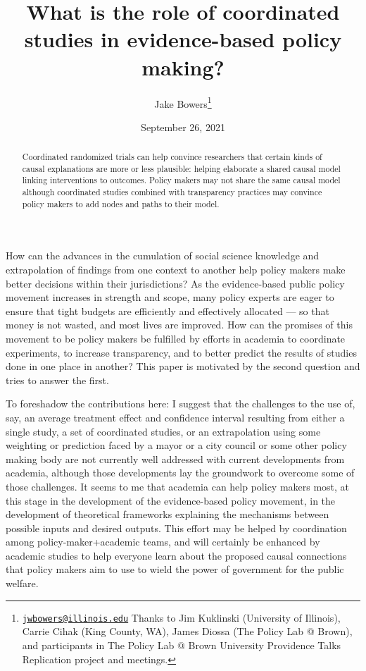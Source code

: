 \documentclass[
  11pt,
]{article}
\title{What is the role of coordinated studies in evidence-based policy
making?}
\author{Jake Bowers\footnote{\href{mailto:jwbowers@illinois.edu}{\nolinkurl{jwbowers@illinois.edu}}
  Thanks to Jim Kuklinski (University of Illinois), Carrie Cihak (King
  County, WA), James Diossa (The Policy Lab @ Brown), and participants
  in The Policy Lab @ Brown University Providence Talks Replication
  project and meetings.}}
\date{September 26, 2021}
\begin{document}
\maketitle

\begin{abstract}

Coordinated randomized trials can help convince researchers that certain kinds
of causal explanations are more or less plausible: helping elaborate a shared
causal model linking interventions to outcomes. Policy makers may not share the
same causal model although coordinated studies combined with transparency
practices may convince policy makers to add nodes and paths to their model.

\end{abstract}

How can the advances in the cumulation of social science knowledge and
extrapolation of findings from one context to another help policy makers
make better decisions within their jurisdictions? As the evidence-based
public policy movement increases in strength and scope, many policy
experts are eager to ensure that tight budgets are efficiently and
effectively allocated --- so that money is not wasted, and most lives
are improved. How can the promises of this movement to be policy makers
be fulfilled by efforts in academia to coordinate experiments, to
increase transparency, and to better predict the results of studies done
in one place in another? This paper is motivated by the second question
and tries to answer the first.

To foreshadow the contributions here: I suggest that the challenges to
the use of, say, an average treatment effect and confidence interval
resulting from either a single study, a set of coordinated studies, or
an extrapolation using some weighting or prediction faced by a mayor or
a city council or some other policy making body are not currently well
addressed with current developments from academia, although those
developments lay the groundwork to overcome some of those challenges. It
seems to me that academia can help policy makers most, at this stage in
the development of the evidence-based policy movement, in the
development of theoretical frameworks explaining the mechanisms between
possible inputs and desired outputs. This effort may be helped by
coordination among policy-maker+academic teams, and will certainly be
enhanced by academic studies to help everyone learn about the proposed
causal connections that policy makers aim to use to wield the power of
government for the public welfare.
\end{document}
